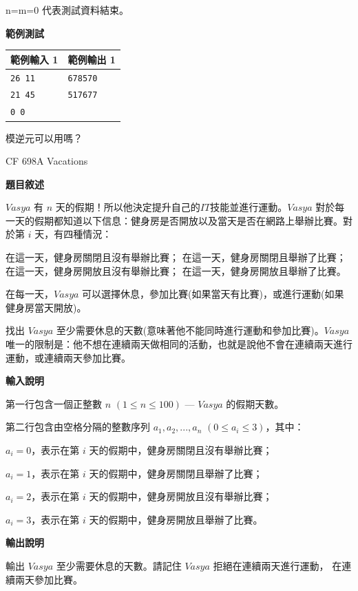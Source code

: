     n=m=0 代表測試資料結束。

    \textbf{範例測試}

    \begin{tabular}{|m{7cm}|m{7cm}|}
        \hline
        範例輸入 1 & 範例輸出 1 \\
        \hline
        \verb|26 11| & \verb|678570| \\
        \verb|21 45| & \verb|517677| \\
        \verb|0 0| & \\
        \hline
    \end{tabular}

    \begin{tip}
        模逆元可以用嗎？
    \end{tip}

    \problem CF 698A Vacations

    \textbf{題目敘述}

    $Vasya$ 有 $n$ 天的假期！所以他決定提升自己的$IT$技能並進行運動。$Vasya$ 對於每一天的假期都知道以下信息：健身房是否開放以及當天是否在網路上舉辦比賽。對於第 $i$ 天，有四種情況：

    在這一天，健身房關閉且沒有舉辦比賽；
    在這一天，健身房關閉且舉辦了比賽；
    在這一天，健身房開放且沒有舉辦比賽；
    在這一天，健身房開放且舉辦了比賽。

    在每一天，$Vasya$ 可以選擇休息，參加比賽(如果當天有比賽)，或進行運動(如果健身房當天開放)。

    找出 $Vasya$ 至少需要休息的天數(意味著他不能同時進行運動和參加比賽)。$Vasya$ 唯一的限制是：他不想在連續兩天做相同的活動，也就是說他不會在連續兩天進行運動，或連續兩天參加比賽。

    \textbf{輸入說明}

    第一行包含一個正整數 $n$ $(1 \le n \le 100)$ — $Vasya$ 的假期天數。

    第二行包含由空格分隔的整數序列 $a_1, a_2, ..., a_n$ $(0 \le a_i \le 3)$，其中：

    $a_i = 0$，表示在第 $i$ 天的假期中，健身房關閉且沒有舉辦比賽；
    
    $a_i = 1$，表示在第 $i$ 天的假期中，健身房關閉且舉辦了比賽；
    
    $a_i = 2$，表示在第 $i$ 天的假期中，健身房開放且沒有舉辦比賽；
    
    $a_i = 3$，表示在第 $i$ 天的假期中，健身房開放且舉辦了比賽。

    \textbf{輸出說明}

    輸出 $Vasya$ 至少需要休息的天數。請記住 $Vasya$ 拒絕在連續兩天進行運動，
    在連續兩天參加比賽。

